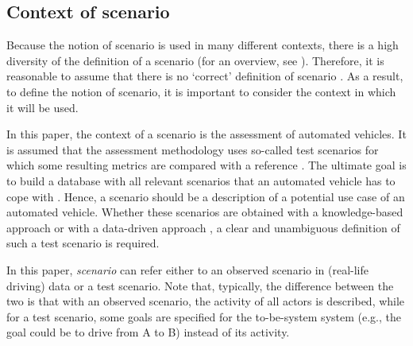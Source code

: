\subsection{Context of scenario}
\label{sec:context}

Because the notion of scenario is used in many different contexts, there is a high diversity of the definition of a scenario (for an overview, see \cite{vannotten2003updated, bishop2007scentechniques}). Therefore, it is reasonable to assume that there is no `correct' definition of scenario \cite{vannotten2003updated}. As a result, to define the notion of scenario, it is important to consider the context in which it will be used.

In this paper, the context of a scenario is the assessment of automated vehicles. It is assumed that the assessment methodology uses so-called test scenarios for which some resulting metrics are compared with a reference \cite{stellet2015taxonomy}. 
The ultimate goal is to build a database with all relevant scenarios that an automated vehicle has to cope with \cite{putz2017pegasus}. Hence, a scenario should be a description of a potential use case of an automated vehicle. 
Whether these scenarios are obtained with a knowledge-based approach \cite{gietelink2004systemvalidation, stellet2015taxonomy} or with a data-driven approach \cite{deGelder2017assessment, stellet2015taxonomy}, a clear and unambiguous definition of such a test scenario is required. 

In this paper, \emph{scenario} can refer either to an observed scenario in (real-life driving) data or a test scenario. Note that, typically, the difference between the two is that with an observed scenario, the activity of all actors is described, while for a test scenario, some goals are specified for the to-be-system system (e.g., the goal could be to drive from A to B) instead of its activity. 

